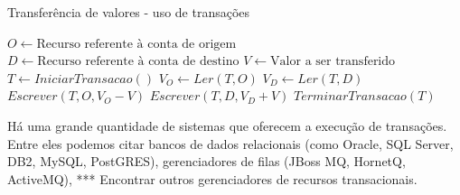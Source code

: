 \documentclass[11pt,twoside,a4paper]{book}
\begin{document}
\begin{algorithm}
\caption{Transferência de valores - uso de transações}
\label{alg:transferencia_valores_transacao}
\begin{algorithmic}[1]
\State $O \gets \text{Recurso referente à conta de origem}$
\State $D \gets \text{Recurso referente à conta de destino}$
\State $V \gets \text{Valor a ser transferido}$
\State $T \gets IniciarTransacao()$
\State $V_O \gets Ler(T, O)$
    \State $V_D \gets Ler(T, D)$
    \State $Escrever(T, O, V_O - V)$
    \State $Escrever(T, D, V_D + V)$
\EndIf
\State $TerminarTransacao(T)$
\end{algorithmic}
\end{algorithm}

Há uma grande quantidade de sistemas que oferecem a execução de transações. Entre eles podemos citar bancos de dados relacionais (como Oracle, SQL Server, DB2, MySQL, PostGRES), gerenciadores de filas (JBoss MQ, HornetQ, ActiveMQ), *** Encontrar outros gerenciadores de recursos transacionais.


\end{document}
